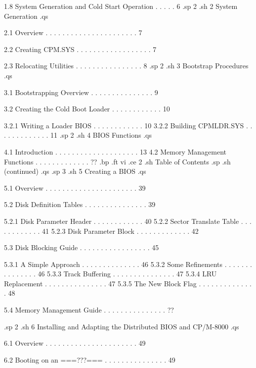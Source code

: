   1.8  System Generation and Cold Start Operation  . . . . .   6 
.sp 2
.sh
2  System Generation
.qs

   2.1  Overview  . . . . . . . . . . . . . . . . . . . . . .   7 

   2.2  Creating CPM.SYS  . . . . . . . . . . . . . . . . . .   7 

   2.3  Relocating Utilities  . . . . . . . . . . . . . . . .   8 
.sp 2
.sh
3  Bootstrap Procedures
.qs

   3.1  Bootstrapping Overview  . . . . . . . . . . . . . . .   9 

   3.2  Creating the Cold Boot Loader . . . . . . . . . . . .  10 

        3.2.1  Writing a Loader BIOS  . . . . . . . . . . . .  10 
        3.2.2  Building CPMLDR.SYS  . . . . . . . . . . . . .  11 
.sp 2
.sh
4  BIOS Functions 
.qs

   4.1  Introduction  . . . . . . . . . . . . . . . . . . . .  13 
   4.2	Memory Management Functions . . . . . . . . . . . . .  ??
.bp
.ft                                 vi
.ce 2
.sh
Table of Contents
.sp
.sh
(continued)
.qs
.sp 3
.sh
5  Creating a BIOS  
.qs

   5.1  Overview  . . . . . . . . . . . . . . . . . . . . . .  39 

   5.2  Disk Definition Tables  . . . . . . . . . . . . . . .  39 

        5.2.1  Disk Parameter Header  . . . . . . . . . . . .  40 
        5.2.2  Sector Translate Table . . . . . . . . . . . .  41 
        5.2.3  Disk Parameter Block . . . . . . . . . . . . .  42 

   5.3  Disk Blocking Guide . . . . . . . . . . . . . . . . .  45 

        5.3.1  A Simple Approach  . . . . . . . . . . . . . .  46
        5.3.2  Some Refinements . . . . . . . . . . . . . . .  46 
        5.3.3  Track Buffering  . . . . . . . . . . . . . . .  47 
        5.3.4  LRU Replacement  . . . . . . . . . . . . . . .  47 
        5.3.5  The New Block Flag . . . . . . . . . . . . . .  48 

   5.4  Memory Management Guide . . . . . . . . . . . . . . .  ??

.sp 2
.sh
6  Installing and Adapting the Distributed BIOS and CP/M-8000   
.qs

   6.1  Overview  . . . . . . . . . . . . . . . . . . . . . .  49 

   6.2  Booting on an ===???===  . . . . . . . . . . . . . . .  49 

